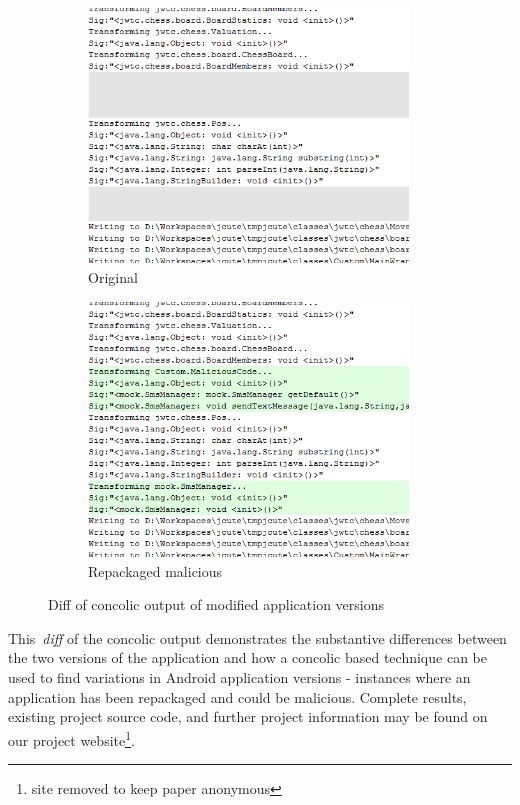 \documentclass{sig-alternate}
\newif\ifisnopii
\newcommand{\sam}[1]{\textcolor{red}{{\it [Sam says: #1]}}}
\begin{document}
\begin{figure}[t]
\centering
\begin{subfigure}[b]{0.49\textwidth}
	\includegraphics[width=8.5cm, angle = 0]{images/DiffClean2.png}
	\caption{Original}
	\label{fig:original}
\end{subfigure}
\begin{subfigure}[b]{0.49\textwidth}
	\includegraphics[width=8.5cm, angle = 0]{images/DiffMalicious2.png}
	\caption{Repackaged malicious}
	\label{fig:malicious}
\end{subfigure}
\caption{Diff of concolic output of modified application versions}
\label{fig:diff1}
\end{figure}

This~\emph{diff} of the concolic output demonstrates the substantive differences between the two versions of the application and how a concolic based technique can be used to find variations in Android application versions - instances where an application has been repackaged and could be malicious. Complete results, existing project source code, and further project information may be found on our project website\footnote{\ifisnopii \url{http://www.se.rit.edu/~dkrutz/CTA/}\else site removed to keep paper anonymous\fi}.
\end{document}
